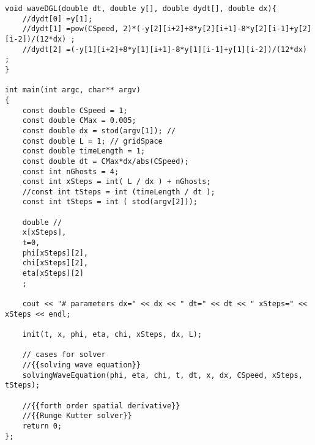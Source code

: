 \documentclass[10pt,fleqn,reqno,a4paper]{article}
\begin{document}
\begin{verbatim}
void waveDGL(double dt, double y[], double dydt[], double dx){
    //dydt[0] =y[1];
    //dydt[1] =pow(CSpeed, 2)*(-y[2][i+2]+8*y[2][i+1]-8*y[2][i-1]+y[2][i-2])/(12*dx) ;
    //dydt[2] =(-y[1][i+2]+8*y[1][i+1]-8*y[1][i-1]+y[1][i-2])/(12*dx) ;
}

int main(int argc, char** argv)
{
    const double CSpeed = 1;
    const double CMax = 0.005;
    const double dx = stod(argv[1]); //
    const double L = 1; // gridSpace
    const double timeLength = 1;
    const double dt = CMax*dx/abs(CSpeed);
    const int nGhosts = 4;
    const int xSteps = int( L / dx ) + nGhosts;
    //const int tSteps = int (timeLength / dt );
    const int tSteps = int ( stod(argv[2]));

    double //
    x[xSteps],
    t=0,
    phi[xSteps][2],
    chi[xSteps][2],
    eta[xSteps][2]
    ;

    cout << "# parameters dx=" << dx << " dt=" << dt << " xSteps=" <<  xSteps << endl;

    init(t, x, phi, eta, chi, xSteps, dx, L);

    // cases for solver
    //{{solving wave equation}}
    solvingWaveEquation(phi, eta, chi, t, dt, x, dx, CSpeed, xSteps, tSteps);

    //{{forth order spatial derivative}}
    //{{Runge Kutter solver}}
	return 0;
};
\end{verbatim}
\end{document}
